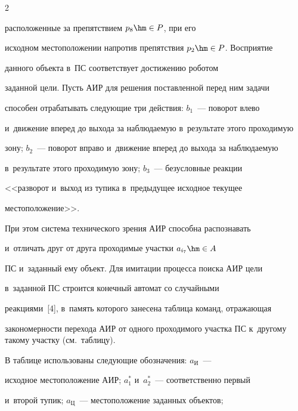 \begin{multicols}{2}





\noindent


 расположенные за препятствием $p_8\hm\in P$, при его 


исходном местоположении напротив препятствия $p_2\hm\in P$. Восприятие 


данного объекта в~ПС соответствует достижению роботом 


заданной цели. Пусть АИР для решения по\-став\-лен\-ной перед ним задачи 


способен отрабатывать сле\-ду\-ющие три действия: $b_1$~--- поворот влево 


и~движение вперед до выхода за наблюдаемую в~результате этого проходимую 


зону; $b_2$~--- поворот вправо и~движение вперед до выхода за наблюдаемую 


в~результате этого проходимую зону; $b_3$~--- безуслов\-ные реакции 


<<разворот и~выход из тупика в~предыду\-щее исходное текущее 


местоположение>>.


  


  При этом система технического зрения АИР способна распознавать 


и~отличать друг от друга проходимые участки $a_{i_7}\hm\in A$ 


ПС и~заданный ему объект. Для имитации процесса поиска АИР цели 


в~заданной ПС строится конечный автомат со случайными 


реакциями~[4], в~память которого занесена таб\-ли\-ца команд, отражающая 


закономерности перехода АИР от одного проходимого участка ПС к~другому такому участку (см.\ таблицу). 


  





    


  В таблице использованы сле\-ду\-ющие обозначения: $a_{\mathrm{И}}$~--- 


исходное местоположение АИР; $a_1^*$ и~$a_2^*$~--- соответственно первый 


и~второй тупик; $a_{\mathrm{Ц}}$~--- местоположение заданных объектов; 



\end{multicols}
